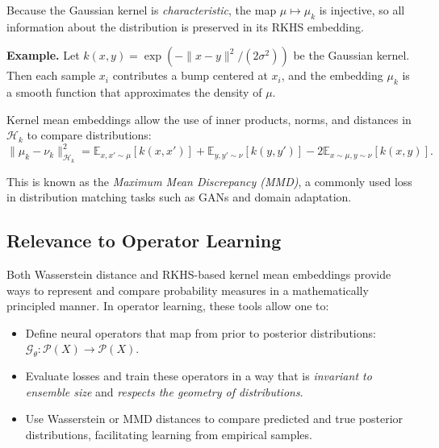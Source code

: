 \documentclass[twoside,11pt]{article}
\begin{document}
Because the Gaussian kernel is \emph{characteristic}, the map $\mu \mapsto \mu_k$ is injective, so all information about the distribution is preserved in its RKHS embedding.


\textbf{Example.} Let $k(x, y) = \exp(-\|x - y\|^2 / (2\sigma^2))$ be the Gaussian kernel. Then each sample $x_i$ contributes a bump centered at $x_i$, and the embedding $\mu_k$ is a smooth function that approximates the density of $\mu$.

Kernel mean embeddings allow the use of inner products, norms, and distances in $\mathcal{H}_k$ to compare distributions:
\[
\|\mu_k - \nu_k\|_{\mathcal{H}_k}^2 = \mathbb{E}_{x, x' \sim \mu}[k(x, x')] + \mathbb{E}_{y, y' \sim \nu}[k(y, y')] - 2 \mathbb{E}_{x \sim \mu, y \sim \nu}[k(x, y)].
\]

This is known as the \emph{Maximum Mean Discrepancy (MMD)}, a commonly used loss in distribution matching tasks such as GANs and domain adaptation.

\subsection{Relevance to Operator Learning}

Both Wasserstein distance and RKHS-based kernel mean embeddings provide ways to represent and compare probability measures in a mathematically principled manner. In operator learning, these tools allow one to:
\begin{itemize}
  \item Define neural operators that map from prior to posterior distributions: $\mathcal{G}_\theta: \mathcal{P}(X) \to \mathcal{P}(X)$.
  \item Evaluate losses and train these operators in a way that is \emph{invariant to ensemble size} and \emph{respects the geometry of distributions}.
  \item Use Wasserstein or MMD distances to compare predicted and true posterior distributions, facilitating learning from empirical samples.
\end{itemize}






\end{document}
